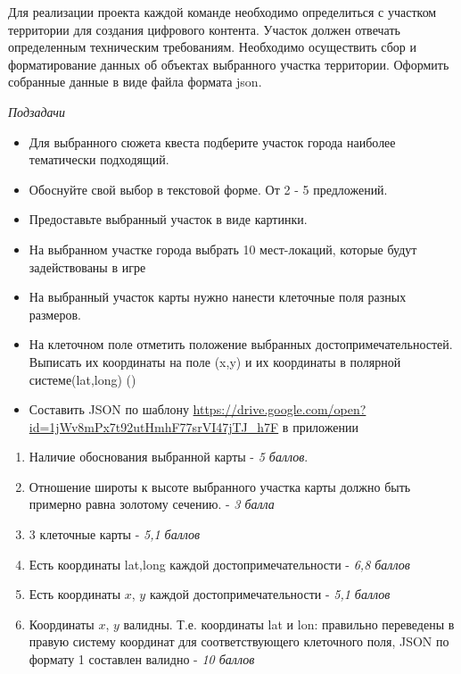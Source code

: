 
Для реализации проекта каждой команде необходимо определиться с участком территории для создания цифрового контента. Участок должен отвечать определенным техническим требованиям. Необходимо осуществить сбор и форматирование данных об объектах выбранного участка территории. Оформить собранные данные в виде файла формата json.

\textit{Подзадачи}
\begin{itemize} 
    \item Для выбранного сюжета квеста подберите участок города наиболее тематически подходящий. 
    \item Обоснуйте свой выбор в текстовой форме. От 2 - 5 предложений.
    \item Предоставьте выбранный участок в виде картинки.
    \item На выбранном участке города выбрать 10 мест-локаций, которые будут задействованы в игре
    \item На выбранный участок карты нужно нанести клеточные поля разных размеров.
    \item На клеточном поле отметить положение выбранных достопримечательностей. Выписать их координаты на поле (x,y) и их координаты в полярной системе(lat,long) ()
    \item Составить JSON по шаблону \url{https://drive.google.com/open?id=1jWv8mPx7t92utHmhF77srVI47jTJ_h7F}  в приложении
\end{itemize}

\markSection

\begin{enumerate}
    \item Наличие обоснования выбранной карты - \textit{5 баллов}.
    \item Отношение широты к высоте выбранного участка карты должно быть примерно равна золотому сечению. - \textit{3 балла}
    \item 3 клеточные карты - \textit{5,1 баллов}
    \item Есть координаты lat,long каждой достопримечательности - \textit{6,8 баллов}
    \item Есть координаты $x$, $y$ каждой достопримечательности - \textit{5,1 баллов}
    \item Координаты $x$, $y$ валидны. Т.е. координаты lat и lon: правильно переведены в правую систему координат для соответствующего клеточного поля, JSON по формату 1 составлен валидно - \textit{10 баллов}
\end{enumerate}


